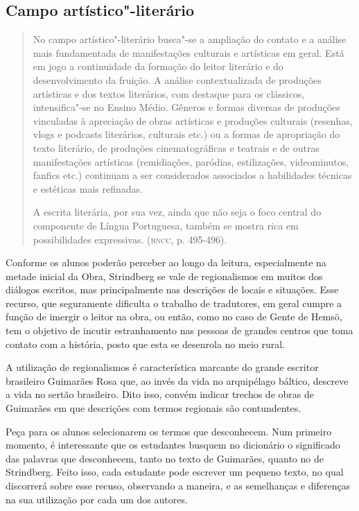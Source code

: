 \documentclass[12pt]{extarticle}
\begin{document}
\subsection{Campo artístico"-literário}

\begin{quote}
No campo artístico"-literário busca"-se a ampliação do contato e a
análise mais fundamentada de manifestações culturais e artísticas em
geral. Está em jogo a continuidade da formação do leitor literário e do
desenvolvimento da fruição. A análise contextualizada de produções
artísticas e dos textos literários, com destaque para os clássicos,
intensifica"-se no Ensino Médio. Gêneros e formas diversas de produções
vinculadas à apreciação de obras artísticas e produções culturais
(resenhas, vlogs e podcasts literários, culturais etc.) ou a formas de
apropriação do texto literário, de produções cinematográficas e teatrais
e de outras manifestações artísticas (remidiações, paródias,
estilizações, videominutos, fanfics etc.) continuam a ser considerados
associados a habilidades técnicas e estéticas mais refinadas.

A escrita literária, por sua vez, ainda que não seja o foco central do
componente de Língua Portuguesa, também se mostra rica em possibilidades
expressivas. (\textsc{bncc}, p. 495-496).
\end{quote}

Conforme os alunos poderão perceber ao longo da leitura, especialmente
na metade inicial da Obra, Strindberg se vale de regionalismos em
muitos dos diálogos escritos, mas principalmente nas descrições de
locais e situações. Esse recurso, que seguramente dificulta o trabalho
de tradutores, em geral cumpre a função de imergir o leitor na obra,
ou então, como no caso de Gente de Hemsö, tem o objetivo de incutir
estranhamento nas pessoas de grandes centros que toma contato com a
história, posto que esta se desenrola no meio rural.

A utilização de regionalismos é característica marcante do grande
escritor brasileiro Guimarães Rosa que, ao invés da vida no arquipélago
báltico, descreve a vida no sertão brasileiro. Dito isso, convém indicar
trechos de obras de Guimarães em que descrições com termos regionais são
contundentes.

Peça para os alunos selecionarem os termos que desconhecem. Num primeiro
momento, é interessante que os estudantes busquem no dicionário o
significado das palavras que desconhecem, tanto no texto de Guimarães,
quanto no de Strindberg. Feito isso, cada estudante pode escrever um
pequeno texto, no qual discorrerá sobre esse recuso, observando a
maneira, e as semelhanças e diferenças na sua utilização por cada um dos
autores.
\end{document}

